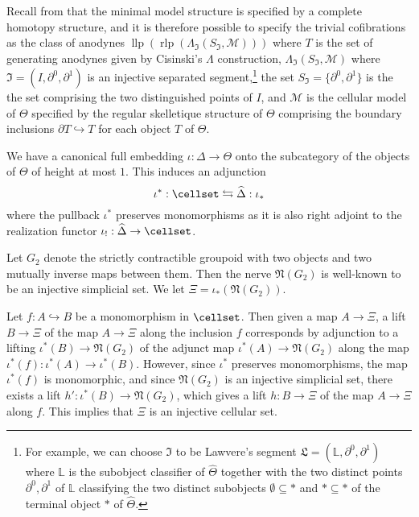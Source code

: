 Recall from \cite{cisinski-book} that the minimal model structure is specified by a complete homotopy structure, and it is therefore possible to specify the trivial cofibrations as the class of anodynes \(\operatorname{llp}(\operatorname{rlp}(\Lambda_{\mathfrak{I}}(S_{\mathfrak{I}},\mathcal{M})))\) where \(T\) is the set of generating anodynes given by Cisinski's  \(\Lambda\) construction, \(\Lambda_{\mathfrak{I}}(S_{\mathfrak{I}},\mathcal{M})\) where \(\mathfrak{I}=(I,\partial^0,\partial^1)\) is an injective separated segment,\footnote{For example, we can choose \(\mathfrak{I}\) to be Lawvere's segment \(\mathfrak{L}=(\mathbb{L},\partial^0,\partial^1)\) where \(\mathbb{L}\) is the subobject classifier of \(\widehat{\Theta}\) together with the two distinct points \(\partial^0,\partial^1\) of \(\mathbb{L}\) classifying the two distinct subobjects \(\emptyset \subseteq \ast\) and \(\ast\subseteq \ast\) of the terminal object \(\ast\) of \(\widehat{\Theta}\).}
the set \(S_\mathfrak{I}=\{\partial^0,\partial^1\}\) is the the set comprising the two distinguished points of \(I\), and \(\mathcal{M}\) is the cellular model of \(\Theta\) specified by the regular skelletique structure of \(\Theta\) comprising the boundary inclusions \(\partial T\hookrightarrow T\) for each object \(T\) of \(\Theta\).

We have a canonical full embedding \(\iota:\Delta\to\Theta\) onto the subcategory of the objects of \(\Theta\) of height at most \(1\). This induces an adjunction 
\[\iota^\ast:\cellset \leftrightarrows \widehat{\Delta}:\iota_\ast\]
where the pullback \(\iota^\ast\) preserves monomorphisms as it is also right adjoint to the realization functor \(\iota_!:\widehat{\Delta}\to \cellset\).    

Let \(G_2\) denote the strictly contractible groupoid with two objects and two mutually inverse maps between them. Then the nerve \(\mathfrak{N}(G_2)\) is well-known to be an injective simplicial set.  We let \(\Xi=\iota_\ast(\mathfrak{N}(G_2))\).  

Let \(f:A\hookrightarrow B\) be a monomorphism in \(\cellset\).  Then given a map \(A\to \Xi\), a lift \(B\to \Xi\) of the map \(A\to \Xi\) along the inclusion \(f\) corresponds by adjunction to a lifting \(\iota^\ast(B)\to \mathfrak{N}(G_2)\) of the adjunct map \(\iota^\ast(A)\to \mathfrak{N}(G_2)\) along the map \(\iota^\ast(f):\iota^\ast(A)\to \iota^\ast(B)\).  However, since \(\iota^\ast\) preserves monomorphisms, the map \(\iota^\ast(f)\) is monomorphic, and since \(\mathfrak{N}(G_2)\) is an injective simplicial set, there exists a lift \(h': \iota^*(B)\to \mathfrak{N}(G_2)\), which gives a lift \(h:B\to \Xi\) of the map \(A\to \Xi\) along \(f\).  This implies that \(\Xi\) is an injective cellular set.  

